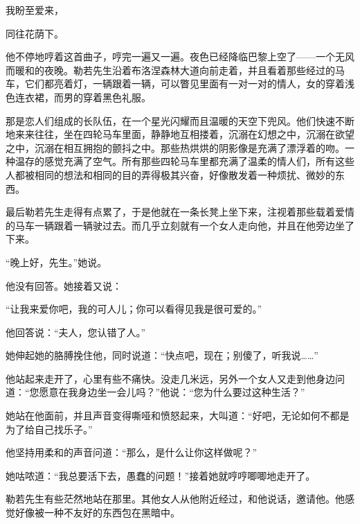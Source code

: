 \documentclass{article}
\begin{document}
我盼至爱来，



同往花荫下。



他不停地哼着这首曲子，哼完一遍又一遍。夜色已经降临巴黎上空了——一个无风而暖和的夜晚。勒若先生沿着布洛涅森林大道向前走着，并且看着那些经过的马车，它们都亮着灯，一辆跟着一辆，可以瞥见里面有一对一对的情人，女的穿着浅色连衣裙，而男的穿着黑色礼服。



那是恋人们组成的长队伍，在一个星光闪耀而且温暖的天空下兜风。他们快速不断地来来往往，坐在四轮马车里面，静静地互相搂着，沉溺在幻想之中，沉溺在欲望之中，沉溺在相互拥抱的颤抖之中。那些热烘烘的阴影像是充满了漂浮着的吻。一种温存的感觉充满了空气。所有那些四轮马车里都充满了温柔的情人们，所有这些人都被相同的想法和相同的目的弄得极其兴奋，好像散发着一种烦扰、微妙的东西。



最后勒若先生走得有点累了，于是他就在一条长凳上坐下来，注视着那些载着爱情的马车一辆跟着一辆驶过去。而几乎立刻就有一个女人走向他，并且在他旁边坐了下来。



“晚上好，先生。”她说。



他没有回答。她接着又说：



“让我来爱你吧，我的可人儿；你可以看得见我是很可爱的。”



他回答说：“夫人，您认错了人。”



她伸起她的胳膊挽住他，同时说道：“快点吧，现在；别傻了，听我说……”



他站起来走开了，心里有些不痛快。没走几米远，另外一个女人又走到他身边问道：“您愿意在我身边坐一会儿吗？”他说：“您为什么要过这种生活？”



她站在他面前，并且声音变得嘶哑和愤怒起来，大叫道：“好吧，无论如何不都是为了给自己找乐子。”



他坚持用柔和的声音问道：“那么，是什么让你这样做呢？”



她咕哝道：“我总要活下去，愚蠢的问题！”接着她就哼哼唧唧地走开了。



勒若先生有些茫然地站在那里。其他女人从他附近经过，和他说话，邀请他。他感觉好像被一种不友好的东西包在黑暗中。
\end{document}

